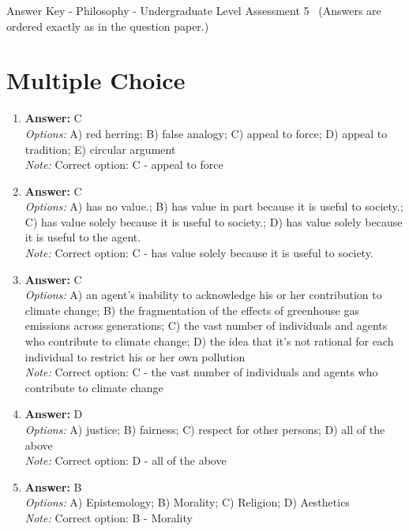 \documentclass[12pt]{article}
\begin{document}
\begin{center}
Answer Key - Philosophy - Undergraduate Level Assessment 5 \
\small (Answers are ordered exactly as in the question paper.)
\end{center}

\section*{Multiple Choice}
\begin{enumerate}[label=\arabic*.]
\item \textbf{Answer:} C
\\ \textit{Options:} A) red herring; B) false analogy; C) appeal to force; D) appeal to tradition; E) circular argument
\\ \textit{Note:} Correct option: C - appeal to force
\item \textbf{Answer:} C
\\ \textit{Options:} A) has no value.; B) has value in part because it is useful to society.; C) has value solely because it is useful to society.; D) has value solely because it is useful to the agent.
\\ \textit{Note:} Correct option: C - has value solely because it is useful to society.
\item \textbf{Answer:} C
\\ \textit{Options:} A) an agent's inability to acknowledge his or her contribution to climate change; B) the fragmentation of the effects of greenhouse gas emissions across generations; C) the vast number of individuals and agents who contribute to climate change; D) the idea that it's not rational for each individual to restrict his or her own pollution
\\ \textit{Note:} Correct option: C - the vast number of individuals and agents who contribute to climate change
\item \textbf{Answer:} D
\\ \textit{Options:} A) justice; B) fairness; C) respect for other persons; D) all of the above
\\ \textit{Note:} Correct option: D - all of the above
\item \textbf{Answer:} B
\\ \textit{Options:} A) Epistemology; B) Morality; C) Religion; D) Aesthetics
\\ \textit{Note:} Correct option: B - Morality
\end{enumerate}
\end{document}
